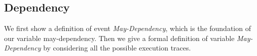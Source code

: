 %
%
%
\subsection{Dependency}
We first show a definition of event \emph{May-Dependency}, which is the foundation of our variable may-dependency.
Then we give a formal definition of variable \emph{May-Dependency} 
by considering all the possible execution traces.
%
